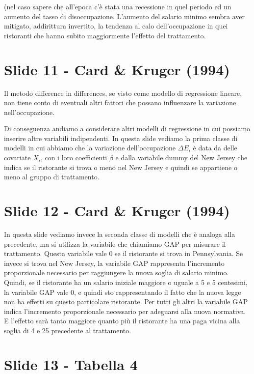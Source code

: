 \documentclass{article}
\begin{document}
(nel caso sapere che all'epoca c'è stata una recessione in quel periodo ed un aumento del tasso di disoccupazione. L'aumento del salario minimo sembra aver mitigato, addirittura invertito, la tendenza al calo dell'occupazione in quei ristoranti che hanno subito maggiormente l'effetto del trattamento. 


\section{Slide 11 - Card \& Kruger (1994)}

Il metodo difference in differences, se visto come modello di regressione lineare, non tiene conto di eventuali altri fattori che possano influenzare la variazione nell'occupazione.

Di conseguenza andiamo a considerare altri modelli di regressione in cui possiamo inserire altre variabili indipendenti. In questa slide vediamo la prima classe di modelli in cui abbiamo che la variazione dell'occupazione $\Delta E_i$ è data da delle covariate $X_i$, con i loro coefficienti $\beta$ e dalla variabile dummy del New Jersey che indica se il ristorante si trova o meno nel New Jersey e quindi se appartiene o meno al gruppo di trattamento.

 

\section{Slide 12 - Card \& Kruger (1994)}

In questa slide vediamo invece la seconda classe di modelli che è analoga alla precedente, ma si utilizza la variabile che chiamiamo GAP per misurare il trattamento. Questa variabile vale 0 se il ristorante si trova in Pennsylvania. Se invece si trova nel New Jersey, la variabile GAP rappresenta l'incremento proporzionale necessario per raggiungere la nuova soglia di salario minimo. Quindi, se il ristorante ha un salario iniziale maggiore o uguale a 5 e 5 centesimi, la variabile GAP vale 0, e quindi sto rappresentando il fatto che la nuova legge non ha effetti su questo particolare ristorante. Per tutti gli altri  la variabile GAP indica l'incremento proporzionale necessario per adeguarsi alla nuova normativa. E l'effetto sarà tanto maggiore quanto più il ristorante ha una paga vicina alla soglia di 4 e 25 precedente al trattamento.


\section{Slide 13 - Tabella 4}
\end{document}
